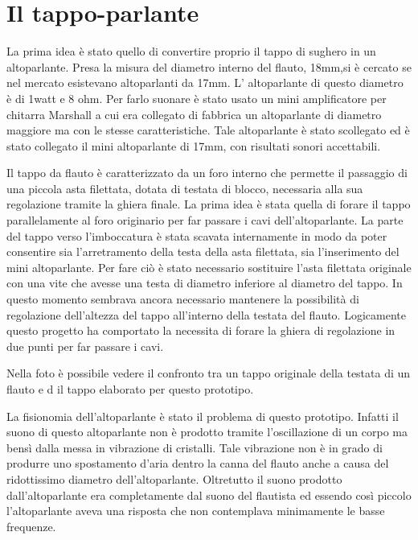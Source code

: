 \section{Il tappo-parlante}

La prima idea è stato quello di convertire proprio il tappo di sughero in un altoparlante. Presa la misura del diametro interno del flauto, 18mm,si è cercato se nel mercato esistevano altoparlanti da 17mm. L’ altoparlante di questo diametro è di 1watt e 8 ohm. Per farlo suonare è stato usato un mini amplificatore per chitarra Marshall a cui era collegato di fabbrica  un altoparlante di diametro maggiore ma con le stesse caratteristiche. Tale altoparlante è stato scollegato ed è stato collegato il mini altoparlante di 17mm, con risultati sonori accettabili.

Il tappo da flauto è caratterizzato da un foro interno che permette il passaggio di una piccola asta filettata, dotata di testata di blocco, necessaria alla sua regolazione tramite la ghiera finale.
La prima idea è stata quella di forare il tappo  parallelamente al foro originario per far passare i cavi dell’altoparlante.
La parte del tappo verso l’imboccatura è stata scavata internamente in modo da poter consentire sia l’arretramento della testa della asta filettata, sia l’inserimento del mini altoparlante.
Per fare ciò è stato necessario sostituire l’asta filettata originale con una vite che avesse una testa di diametro inferiore al diametro del tappo. In questo momento sembrava ancora necessario mantenere la possibilità di regolazione dell’altezza del tappo all’interno della testata del flauto.
Logicamente questo progetto ha comportato la necessita di forare la ghiera di regolazione in due punti per far passare i cavi.

Nella foto è possibile vedere il confronto tra un tappo originale della testata di un flauto e d il tappo elaborato per questo prototipo.

La fisionomia dell’altoparlante è stato il problema di questo prototipo.
Infatti il suono di questo altoparlante non è prodotto tramite l’oscillazione di un corpo ma bensì dalla messa in vibrazione di cristalli. Tale vibrazione non è in grado di  produrre uno spostamento d’aria dentro la canna del flauto anche a causa del ridottissimo diametro dell’altoparlante. Oltretutto il suono prodotto dall’altoparlante era completamente dal suono del flautista ed essendo così piccolo l’altoparlante aveva una risposta che non contemplava minimamente le basse frequenze.

